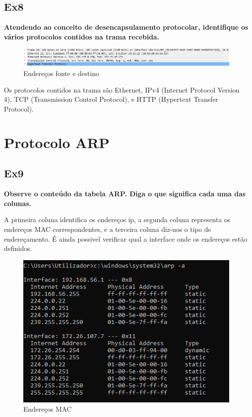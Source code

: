\documentclass{article}
\begin{document}
\subsection{Ex8}
\textbf{Atendendo ao conceito de desencapsulamento protocolar, identifique os vários protocolos contidos na trama recebida.}\\\par
\begin{figure}[h]
	\centering
	\includegraphics[scale = 0.6]{ex-8.JPG}
	\caption{Endereços fonte e destino}
\end{figure}
Os protocolos contidos na trama são Ethernet, IPv4 (Internet Protocol Version 4), TCP (Transmission Control Protocol), e HTTP (Hypertext Transfer Protocol).

\section{Protocolo ARP}
\subsection{Ex9}
\textbf{Observe o conteúdo da tabela ARP. Diga o que significa cada uma das colunas.}\\\par
A primeira coluna identifica os endereços ip, a segunda coluna representa os endereços MAC correspondentes, e a terceira coluna diz-nos o tipo de endereçamento. É ainda possivel verificar qual a interface onde os endereços estão definidos.
\begin{figure}[h]
	\centering
	\includegraphics[scale = 0.8]{ex9.PNG}
	\caption{Endereços MAC}
\end{figure}
\end{document}
